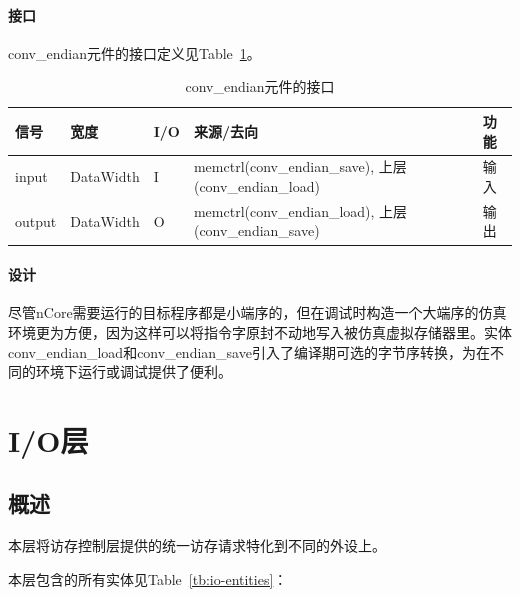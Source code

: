 \documentclass{article}
\begin{document}
\begin{spacing}{1.4}
\paragraph{接口}\mbox{}

conv\_endian元件的接口定义见Table~\ref{tb:convendian-interface}。
\begin{table}[!htb]
\begin{center}
\begin{tabular*}{15cm}{l|l|l|l|p{5cm}}
\hline
\textbf{信号}&\textbf{宽度}&\textbf{I/O}&\textbf{来源/去向}&\textbf{功能} \\
\hline input                   & DataWidth              & I     & memctrl(conv\_endian\_save), 上层(conv\_endian\_load)   & 输入 \\
\hline output                  & DataWidth              & O     & memctrl(conv\_endian\_load), 上层(conv\_endian\_save)   & 输出 \\
\hline
\end{tabular*}
\caption{conv\_endian元件的接口}
\label{tb:convendian-interface}
\end{center}
\end{table}

\paragraph{设计}\mbox{}

尽管nCore需要运行的目标程序都是小端序的，但在调试时构造一个大端序的仿真环境更为方便，因为这样可以将指令字原封不动地写入被仿真虚拟存储器里。实体conv\_endian\_load和conv\_endian\_save引入了编译期可选的字节序转换，为在不同的环境下运行或调试提供了便利。

\section{I/O层}

\subsection{概述}

本层将访存控制层提供的统一访存请求特化到不同的外设上。

本层包含的所有实体见Table~\ref{tb:io-entities}：


\end{spacing}
\end{document}
